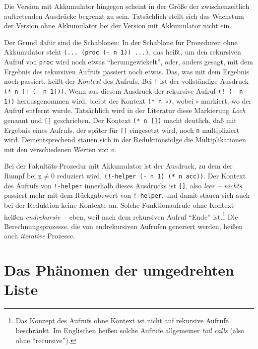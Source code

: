 Die Version mit Akkumulator hingegen scheint in der Größe der
zwischenzeitlich auftretenden Ausdrücke begrenzt zu sein.  Tatsächlich
stellt sich das Wachstum der Version ohne Akkumulator bei der Version
mit Akkumulator nicht ein.

Der Grund dafür sind die Schablonen: In der Schablone für Prozeduren
ohne Akkumulator steht \texttt{(... (proc (- n 1)) ...)}, das
heißt, um den rekursiven Aufruf von \texttt{proc} wird noch
etwas "`herumgewickelt"', oder, anders gesagt, mit dem Ergebnis des
rekursiven Aufrufs passiert noch etwas.  Das, was mit dem Ergebnis
noch passiert, heißt der \textit{Kontext} des Aufrufs.
Bei \texttt{!} ist der vollständige Ausdruck \texttt{(* n (! (- n
  1)))}.  Wenn aus diesem Ausdruck der rekursive Aufruf \texttt{(! (-
  n 1))} herausgenommen wird, bleibt der Kontext \texttt{(* n
  \(\circ\))}, wobei $\circ$ markiert, wo der Aufruf entfernt
wurde.  Tatsächlich wird in der Literatur diese Markierung
\textit{Loch} genannt und \texttt{[]} geschrieben.  Der
Kontext \texttt{(* n [])} macht deutlich, daß mit Ergebnis eines
Aufrufs, der später für \texttt{[]} eingesetzt wird, noch \texttt{n}
multipliziert wird.  Dementsprechend stauen sich in der
Reduktionsfolge die Multiplikationen mit den verschiedenen Werten von
\texttt{n}.

Bei der Fakultäts-Prozedur mit Akkumulator ist der Ausdruck, zu dem
der Rumpf bei $\texttt{n} \neq 0$ reduziert wird, \texttt{(!-helper (- n 1)
  (* n acc))}.  Der Kontext des Aufrufs von \texttt{!-helper} innerhalb
dieses Ausdrucks ist \texttt{[]}, also \emph{leer}~-- \emph{nichts}
passiert mehr mit dem Rückgabewert von \texttt{!-helper}, und damit stauen
sich auch bei der Reduktion keine Kontexte an.  Solche Funktionaufrufe
ohne Kontext heißen \textit{endrekursiv}~-- eben,
weil nach dem rekursiven Aufruf "`Ende"' ist.\footnote{Das Konzept des
  Aufrufs ohne Kontext ist nicht auf rekursive Aufrufe beschränkt.  Im
  Englischen heißen solche Aufrufe allgemeiner \textit{tail
    calls} (also ohne "`recursive"').}
Die Berechnungsprozesse, die von endrekursiven Aufrufen generiert
werden, heißen auch \textit{iterative} Prozesse.

\section{Das Phänomen der umgedrehten Liste}

